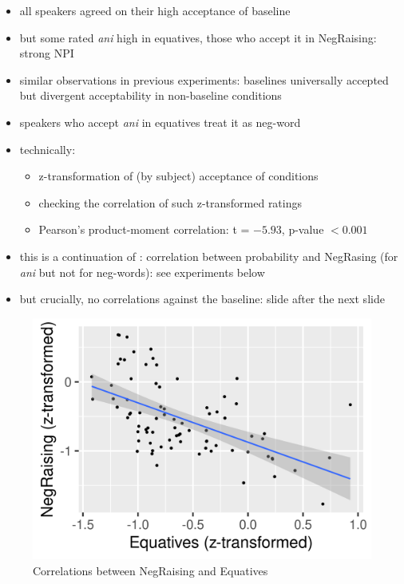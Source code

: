 \documentclass[
  letterpaper,
  DIV=11,
  numbers=noendperiod]{scrartcl}
\providecommand{\tightlist}{%
  \setlength{\itemsep}{0pt}\setlength{\parskip}{0pt}}\usepackage{longtable,booktabs,array}
\begin{document}
\begin{itemize}
\tightlist
\item
  all speakers agreed on their high acceptance of baseline
\item
  but some rated \emph{ani} high in equatives, those who accept it in
  NegRaising: strong NPI
\item
  similar observations in previous experiments: baselines universally
  accepted but divergent acceptability in non-baseline conditions
\item
  speakers who accept \emph{ani} in equatives treat it as neg-word
\item
  technically:

  \begin{itemize}
  \tightlist
  \item
    z-transformation of (by subject) acceptance of conditions
  \item
    checking the correlation of such z-transformed ratings
  \item
    Pearson's product-moment correlation: t = \(-5.93\), p-value
    \(< 0.001\)
  \end{itemize}
\item
  this is a continuation of \textcite{docekaldotlacilsubber}:
  correlation between probability and NegRasing (for \emph{ani} but not
  for neg-words): see experiments below
\item
  but crucially, no correlations against the baseline: slide after the
  next slide
\end{itemize}

\begin{figure}

{\centering \includegraphics{"correlations_ani.png"}

}

\caption{Correlations between NegRaising and Equatives}

\end{figure}
\end{document}
